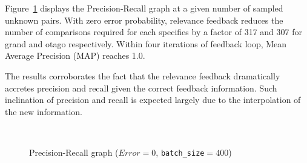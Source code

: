 Figure~\ref{pr_curves} displays the Precision-Recall graph at a given number of
sampled unknown pairs. With zero error probability, relevance feedback reduces
the number of comparisons required for each specifies by a factor of 317 and
307 for grand and otago respectively. Within four iterations of feedback loop,
Mean Average Precision (MAP) reaches 1.0.

The results corroborates the fact that the relevance feedback dramatically
accretes precision and recall given the correct feedback information. Such
inclination of precision and recall is expected largely due to the
interpolation of the new information.

\begin{figure}[h!]
  \centering
  \\
  \captionsetup{justification=centering}
  \caption{Precision-Recall graph ($Error=0$, \texttt{batch\_size}$=400$)}
  \label{pr_curves} %
\end{figure}

